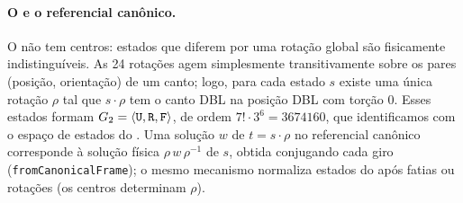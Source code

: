 \paragraph{O  e o referencial canônico.} O  não tem centros: estados que diferem por uma rotação global são fisicamente indistinguíveis. As 24 rotações agem simplesmente transitivamente sobre os pares (posição, orientação) de um canto; logo, para cada estado $s$ existe uma única rotação $\rho$ tal que $s\cdot\rho$ tem o canto DBL na posição DBL com torção 0\proj. Esses estados formam $G_2=\langle\texttt{U},\texttt{R},\texttt{F}\rangle$, de ordem $7!\cdot3^6=\num{3674160}$\lit\ver, que identificamos com o espaço de estados do . Uma solução $w$ de $t=s\cdot\rho$ no referencial canônico corresponde à solução física $\rho\,w\,\rho^{-1}$ de $s$, obtida conjugando cada giro (\texttt{fromCanonicalFrame}); o mesmo mecanismo normaliza estados do  após fatias ou rotações (os centros determinam $\rho$).

